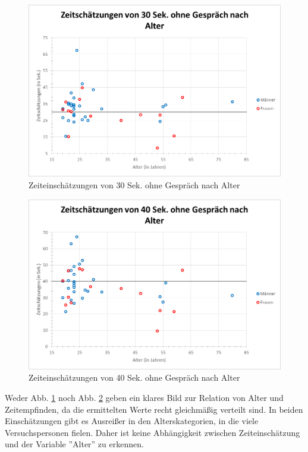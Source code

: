 \documentclass{Paper}
\begin{document}
\begin{figure}[H]
	\centering
	\includegraphics[scale=0.7]{../Diagramme/scatterPre/30ohne_alter.png}
	\caption{Zeiteinschätzungen von 30 Sek. ohne Gespräch nach Alter}
	\label{img:alter30ohne}
\end{figure}
\clearpage
\begin{figure}[H]
	\centering
	\includegraphics[scale=0.7]{../Diagramme/scatterPre/40ohne_alter.png}
	\caption{Zeiteinschätzungen von 40 Sek. ohne Gespräch nach Alter}
	\label{img:alter40ohne}
\end{figure}


Weder Abb. \ref{img:alter30ohne} noch Abb. \ref{img:alter40ohne} geben ein klares Bild zur Relation von Alter und Zeitempfinden, da die ermittelten Werte recht gleichmäßig verteilt sind. In beiden Einschätzungen gibt es Ausreißer in den Alterskategorien, in die viele Versuchspersonen fielen. Daher ist keine Abhängigkeit zwischen Zeiteinschätzung und der Variable ''Alter'' zu erkennen. %
\end{document}
